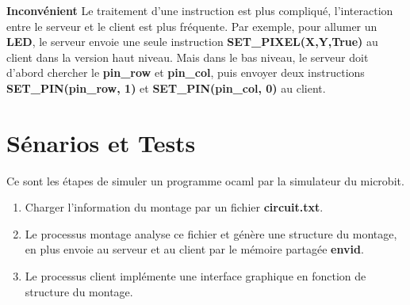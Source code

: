 \documentclass[14px]{article}
\begin{document}
\textbf{Inconvénient}
Le traitement d'une instruction est plus compliqué, l'interaction entre le serveur et le client est plus fréquente. Par exemple, pour allumer un \textbf{LED}, le serveur envoie une seule instruction \textbf{SET\_PIXEL(X,Y,True)} au client dans la version haut niveau. Mais dans le bas niveau, le serveur doit d'abord chercher le \textbf{pin\_row} et \textbf{pin\_col}, puis envoyer deux instructions \textbf{SET\_PIN(pin\_row, 1)} et \textbf{SET\_PIN(pin\_col, 0)} au client.

\clearpage

\section{Sénarios et Tests}
Ce sont les étapes de simuler un programme ocaml par la simulateur du microbit.
\begin{enumerate}
	\item Charger l'information du montage par un fichier \textbf{circuit.txt}.
	\item Le processus montage analyse ce fichier et génère une structure du montage, en plus envoie au serveur et au client par le mémoire partagée \textbf{envid}.
	\item Le processus client implémente une interface graphique en fonction de structure du montage.
	\begin{figure}[htbp]
		\centering
\end{figure}
\end{enumerate}
\end{document}
